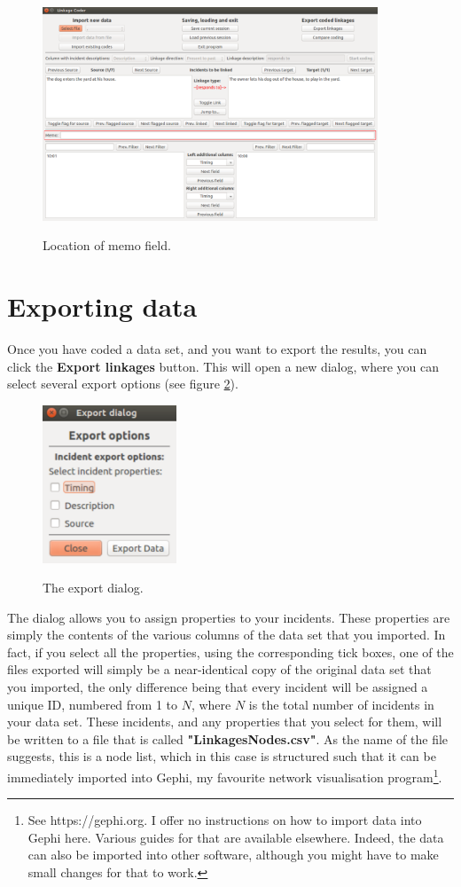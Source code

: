 \documentclass{memoir}
\begin{document}
\begin{figure}[h!]
  \centering
  \caption{Location of memo field.}
  \includegraphics[width=100mm]{Screenshot_11.pdf}
  \label{fig:memo}
\end{figure}


\section{Exporting data}
\label{sec:exportingdata}

Once you have coded a data set, and you want to export the results, you can click the \textbf{Export linkages} button. This will open a new dialog, where you can select several export options (see figure \ref{fig:exportdialog}).

\begin{figure}[h!]
  \centering
  \caption{The export dialog.}
  \includegraphics[width=40mm]{Screenshot_12.pdf}
  \label{fig:exportdialog}
\end{figure}

The dialog allows you to assign properties to your incidents. These properties are simply the contents of the various columns of the data set that you imported. In fact, if you select all the properties, using the corresponding tick boxes, one of the files exported will simply be a near-identical copy of the original data set that you imported, the only difference being that every incident will be assigned a unique ID, numbered from 1 to \(N\), where \(N\) is the total number of incidents in your data set. These incidents, and any properties that you select for them, will be written to a file that is called \textbf{"Linkages\textunderscore Nodes.csv"}. As the name of the file suggests, this is a node list, which in this case is structured such that it can be immediately imported into Gephi, my favourite network visualisation program\footnote{See https://gephi.org. I offer no instructions on how to import data into Gephi here. Various guides for that are available elsewhere. Indeed, the data can also be imported into other software, although you might have to make small changes for that to work.}. 
\end{document}
